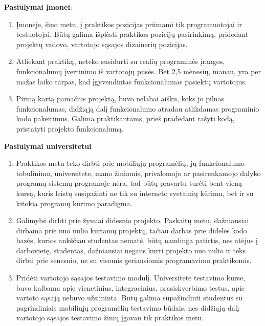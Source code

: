 \documentclass{VUMIFPSPraktika}
\begin{document}
\textbf{Pasiūlymai įmonei}:
\begin{enumerate}
    \item Įmonėje, šiuo metu, į praktikos pozicijas priimami tik programuotojai ir testuotojai. Būtų galima išplėsti praktikos pozicijų pasirinkimą, pridedant projektų vadovo, vartotojo sąsajos dizainerių pozicijas.
    \item Atliekant praktiką, neteko susidurti su realių programinės įrangos, funkcionalumų įvertinimo iš vartotojų pusės. Bet 2,5 mėnesių, manau, yra per mažas laiko tarpas, kad įgyvendintas funkcionalumas pasiektų vartotojus.
    \item Pirmą kartą pamačius projektą, buvo nelabai aišku, koks jo pilnas funkcionalumas, didžiąją dalį funkcionalumo atradau atlikdamas programinio kodo pakeitimus. Galima praktikantams, prieš pradedant rašyti kodą, pristatyti projekto funkcionalumą.
\end{enumerate}


\textbf{Pasiūlymai universitetui}
\begin{enumerate}
    \item Praktikos metu teko dirbti prie mobiliųjų programėlių, jų funkcionalumo tobulinimo, universitete, mano žiniomis, privalomojo ar pasirenkamojo dalyko programų sistemų programoje nėra, tad būtų pravartu turėti bent vieną kursą, kuris leistų susipažinti ne tik su interneto svetainių kūrimu, bet ir su kitokia programų kūrimo paradigma.
    \item Galimybė dirbti prie žymiai didesnio projekto. Paskaitų metu, dažniausiai dirbama prie nuo nulio kuriamų projektų, tačiau darbas prie didelės kodo bazės, kurios ankščiau studentas nematė, būtų naudinga patirtis, nes atėjus į darbovietę, studentas, dažniausiai negaus kurti projekto nuo nulio ir teks dirbti prie senesnio, ne su visomis geriausiomis programavimo praktikomis.
    \item Pridėti vartotojo sąsajos testavimo modulį. Universitete testavimo kurse, buvo kalbama apie vienetinius, integracinius, prasiskverbimo testus, apie vartoto sąsają nebuvo užsiminta. Būtų galima supažindinti studentus su pagrindiniais mobiliųjų programėlių testavimo būdais, nes didžiąją dalį vartotojo sąsajos testavimo žinių įgavau tik praktikos metu. 
\end{enumerate}
\end{document}
